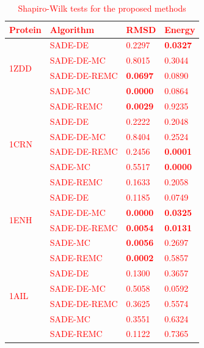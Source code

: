 \textcolor{red}{
\begin{table}[ht!]
  \centering
  \begin{tabular}{ l | l | l | l }
    \hline \hline
Protein                & Algorithm    & RMSD            & Energy          \\ \hline \hline
\multirow{4}{*}{1ZDD}  & SADE-DE      & 0.2297          & \textbf{0.0327} \\ \cline{2-4}
                       & SADE-DE-MC   & 0.8015          & 0.3044          \\ \cline{2-4}
                       & SADE-DE-REMC & \textbf{0.0697} & 0.0890          \\ \cline{2-4}
                       & SADE-MC      & \textbf{0.0000} & 0.0864          \\ \cline{2-4}
                       & SADE-REMC    & \textbf{0.0029} & 0.9235          \\ \hline \hline
\multirow{4}{*}{1CRN}  & SADE-DE      & 0.2222          & 0.2048          \\ \cline{2-4}
                       & SADE-DE-MC   & 0.8404          & 0.2524          \\ \cline{2-4}
                       & SADE-DE-REMC & 0.2456          & \textbf{0.0001} \\ \cline{2-4}
                       & SADE-MC      & 0.5517          & \textbf{0.0000} \\ \cline{2-4}
                       & SADE-REMC    & 0.1633          & 0.2058          \\ \hline \hline
\multirow{4}{*}{1ENH}  & SADE-DE      & 0.1185          & 0.0749          \\ \cline{2-4}
                       & SADE-DE-MC   & \textbf{0.0000} & \textbf{0.0325} \\ \cline{2-4}
                       & SADE-DE-REMC & \textbf{0.0054} & \textbf{0.0131} \\ \cline{2-4}
                       & SADE-MC      & \textbf{0.0056} & 0.2697          \\ \cline{2-4}
                       & SADE-REMC    & \textbf{0.0002} & 0.5857          \\ \hline \hline
\multirow{4}{*}{1AIL}  & SADE-DE      & 0.1300          & 0.3657          \\ \cline{2-4}
                       & SADE-DE-MC   & 0.5058          & 0.0592          \\ \cline{2-4}
                       & SADE-DE-REMC & 0.3625          & 0.5574          \\ \cline{2-4}
                       & SADE-MC      & 0.3551          & 0.6324          \\ \cline{2-4}
                       & SADE-REMC    & 0.1122          & 0.7365          \\ \hline \hline
  \end{tabular}
  \caption{Shapiro-Wilk tests for the proposed methods}
  \label{tab:proposed-methods-shapiro}
\end{table}
}

